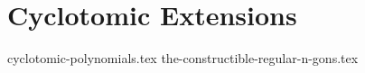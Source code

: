 \chapter{Cyclotomic Extensions}
{cyclotomic-polynomials.tex}
{the-constructible-regular-n-gons.tex}
